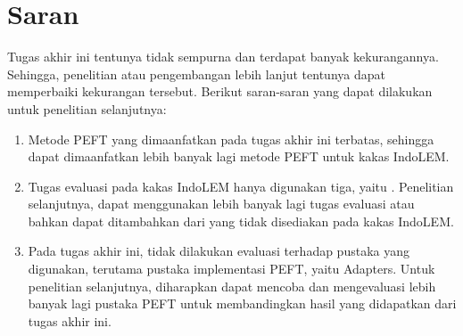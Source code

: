 \section{Saran}

Tugas akhir ini tentunya tidak sempurna dan terdapat banyak kekurangannya. Sehingga, penelitian atau pengembangan lebih lanjut tentunya dapat memperbaiki kekurangan tersebut. Berikut saran-saran yang dapat dilakukan untuk penelitian selanjutnya:
\begin{enumerate}
    \item{
        Metode PEFT yang dimaanfatkan pada tugas akhir ini terbatas, sehingga dapat dimaanfatkan lebih banyak lagi metode PEFT untuk kakas IndoLEM.
    }
    \item {
        Tugas evaluasi pada kakas IndoLEM hanya digunakan tiga, yaitu \nlptask. Penelitian selanjutnya, dapat menggunakan lebih banyak lagi tugas evaluasi atau bahkan dapat ditambahkan dari yang tidak disediakan pada kakas IndoLEM.
    }
    \item {
        Pada tugas akhir ini, tidak dilakukan evaluasi terhadap pustaka yang digunakan, terutama pustaka implementasi PEFT, yaitu Adapters. Untuk penelitian selanjutnya, diharapkan dapat mencoba dan mengevaluasi lebih banyak lagi pustaka PEFT untuk membandingkan hasil yang didapatkan dari tugas akhir ini.
    }
\end{enumerate}
